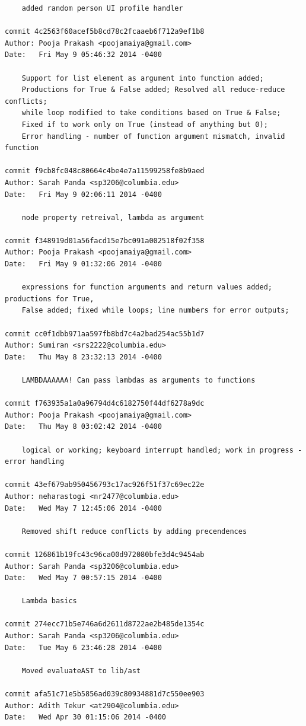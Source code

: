 \documentclass[a4paper]{article}
\begin{document}
\begin{verbatim}
    added random person UI profile handler

commit 4c2563f60acef5b8cd78c2fcaaeb6f712a9ef1b8
Author: Pooja Prakash <poojamaiya@gmail.com>
Date:   Fri May 9 05:46:32 2014 -0400

    Support for list element as argument into function added; 
    Productions for True & False added; Resolved all reduce-reduce conflicts; 
    while loop modified to take conditions based on True & False; 
    Fixed if to work only on True (instead of anything but 0); 
    Error handling - number of function argument mismatch, invalid function

commit f9cb8fc048c80664c4be4e7a11599258fe8b9aed
Author: Sarah Panda <sp3206@columbia.edu>
Date:   Fri May 9 02:06:11 2014 -0400

    node property retreival, lambda as argument

commit f348919d01a56facd15e7bc091a002518f02f358
Author: Pooja Prakash <poojamaiya@gmail.com>
Date:   Fri May 9 01:32:06 2014 -0400

    expressions for function arguments and return values added; productions for True, 
    False added; fixed while loops; line numbers for error outputs;

commit cc0f1dbb971aa597fb8bd7c4a2bad254ac55b1d7
Author: Sumiran <srs2222@columbia.edu>
Date:   Thu May 8 23:32:13 2014 -0400

    LAMBDAAAAAA! Can pass lambdas as arguments to functions

commit f763935a1a0a96794d4c6182750f44df6278a9dc
Author: Pooja Prakash <poojamaiya@gmail.com>
Date:   Thu May 8 03:02:42 2014 -0400

    logical or working; keyboard interrupt handled; work in progress - error handling

commit 43ef679ab950456793c17ac926f51f37c69ec22e
Author: neharastogi <nr2477@columbia.edu>
Date:   Wed May 7 12:45:06 2014 -0400

    Removed shift reduce conflicts by adding precendences

commit 126861b19fc43c96ca00d972080bfe3d4c9454ab
Author: Sarah Panda <sp3206@columbia.edu>
Date:   Wed May 7 00:57:15 2014 -0400

    Lambda basics

commit 274ecc71b5e746a6d2611d8722ae2b485de1354c
Author: Sarah Panda <sp3206@columbia.edu>
Date:   Tue May 6 23:46:28 2014 -0400

    Moved evaluateAST to lib/ast

commit afa51c71e5b5856ad039c80934881d7c550ee903
Author: Adith Tekur <at2904@columbia.edu>
Date:   Wed Apr 30 01:15:06 2014 -0400


\end{verbatim}
\end{document}

